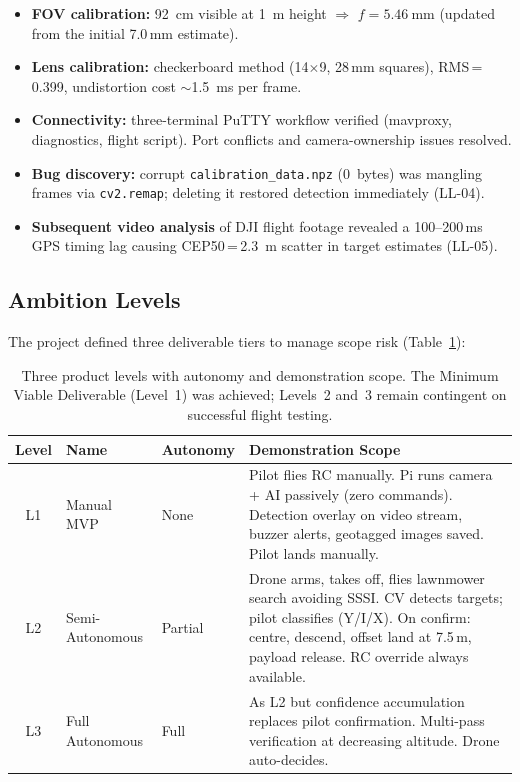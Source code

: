 \begin{itemize}[leftmargin=1.5em]
  \item \textbf{FOV calibration:} \SI{92}{\centi\metre} visible at
        \SI{1}{\metre} height $\Rightarrow$
        $f = \SI{5.46}{\milli\metre}$ (updated from the
        initial 7.0\,mm estimate).
  \item \textbf{Lens calibration:} checkerboard method (14$\times$9,
        28\,mm squares), RMS\,=\,0.399, undistortion cost
        $\sim$\SI{1.5}{\milli\second} per frame.
  \item \textbf{Connectivity:} three-terminal PuTTY workflow verified
        (mavproxy, diagnostics, flight script).  Port conflicts and
        camera-ownership issues resolved.
  \item \textbf{Bug discovery:} corrupt
        \texttt{calibration\_data.npz} (0~bytes) was mangling frames
        via \texttt{cv2.remap}; deleting it restored detection
        immediately (LL-04).
  \item \textbf{Subsequent video analysis} of DJI flight footage
        revealed a 100--200\,ms GPS timing lag causing
        CEP50\,=\,\SI{2.3}{\metre} scatter in target estimates
        (LL-05).
\end{itemize}

\subsection{Ambition Levels}\label{sec:ambition-levels}

The project defined three deliverable tiers to manage scope risk (Table~\ref{tab:ambition-levels}):

\begin{table}[H]
\centering
\compactTable
\caption{Three product levels with autonomy and demonstration scope.  The Minimum Viable Deliverable (Level~1) was achieved; Levels~2 and~3 remain contingent on successful flight testing.}
\label{tab:ambition-levels}
\begin{tabularx}{\linewidth}{@{}c l l X@{}}
\toprule
\textbf{Level} & \textbf{Name} & \textbf{Autonomy} & \textbf{Demonstration Scope} \\
\midrule
L1 & Manual MVP & None &
  Pilot flies RC manually.  Pi runs camera + AI passively
  (zero commands).  Detection overlay on video stream, buzzer alerts,
  geotagged images saved.  Pilot lands manually. \\
\addlinespace
L2 & Semi-Autonomous & Partial &
  Drone arms, takes off, flies lawnmower search avoiding SSSI.
  CV detects targets; pilot classifies (Y/I/X).  On confirm: centre,
  descend, offset land at 7.5\,m, payload release.  RC override
  always available. \\
\addlinespace
L3 & Full Autonomous & Full &
  As L2 but confidence accumulation replaces pilot confirmation.
  Multi-pass verification at decreasing altitude.  Drone auto-decides. \\
\bottomrule
\end{tabularx}
\end{table}

